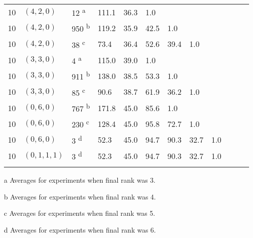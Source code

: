\begin{table*}[ht]
\begin{threeparttable}
\begin{tabular}{llllllllllll}
      10  & $(4, 2, 0)$          & 12 \textsuperscript{a}  & 111.1 & 36.3    & 1.0     &         &         &         &         &         \\
      10  & $(4, 2, 0)$          & 950 \textsuperscript{b} & 119.2 & 35.9    & 42.5    & 1.0     &         &         &         &         \\
      10  & $(4, 2, 0)$          & 38 \textsuperscript{c}  & 73.4  & 36.4    & 52.6    & 39.4    & 1.0     &         &         &         \\
      10  & $(3, 3, 0)$          & 4 \textsuperscript{a}   & 115.0 & 39.0    & 1.0     &         &         &         &         &         \\
      10  & $(3, 3, 0)$          & 911 \textsuperscript{b} & 138.0 & 38.5    & 53.3    & 1.0     &         &         &         &         \\
      10  & $(3, 3, 0)$          & 85 \textsuperscript{c}  & 90.6  & 38.7    & 61.9    & 36.2    & 1.0     &         &         &         \\
      10  & $(0, 6, 0)$          & 767 \textsuperscript{b} & 171.8 & 45.0    & 85.6    & 1.0     &         &         &         &         \\
      10  & $(0, 6, 0)$          & 230 \textsuperscript{c} & 128.4 & 45.0    & 95.8    & 72.7    & 1.0     &         &         &         \\
      10  & $(0, 6, 0)$          & 3 \textsuperscript{d}   & 52.3  & 45.0    & 94.7    & 90.3    & 32.7    & 1.0     &         &         \\
      10  & $(0, 1, 1, 1)$       & 3 \textsuperscript{d}   & 52.3  & 45.0    & 94.7    & 90.3    & 32.7    & 1.0     &         &         \\
      \bottomrule\addlinespace[1ex]
    \end{tabular}
    \begin{tablenotes}\footnotesize
      \item [a] Averages for experiments when final rank was 3.
      \item [b] Averages for experiments when final rank was 4.
      \item [c] Averages for experiments when final rank was 5.
      \item [d] Averages for experiments when final rank was 6.
    \end{tablenotes}
  \end{threeparttable}
\end{table*}

